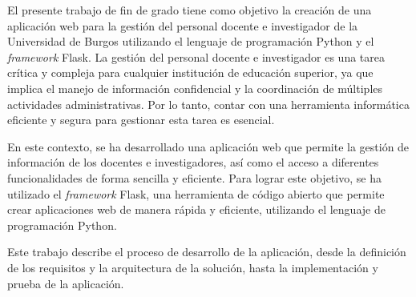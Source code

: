 
El presente trabajo de fin de grado tiene como objetivo la creación de una aplicación web para la gestión del personal docente e investigador de la Universidad de Burgos utilizando el lenguaje de programación Python y el \textit{framework} Flask. La gestión del personal docente e investigador es una tarea crítica y compleja para cualquier institución de educación superior, ya que implica el manejo de información confidencial y la coordinación de múltiples actividades administrativas. Por lo tanto, contar con una herramienta informática eficiente y segura para gestionar esta tarea es esencial.

En este contexto, se ha desarrollado una aplicación web que permite la gestión de información de los docentes e investigadores, así como el acceso a diferentes funcionalidades de forma sencilla y eficiente. Para lograr este objetivo, se ha utilizado el \textit{framework} Flask, una herramienta de código abierto que permite crear aplicaciones web de manera rápida y eficiente, utilizando el lenguaje de programación Python.

Este trabajo describe el proceso de desarrollo de la aplicación, desde la definición de los requisitos y la arquitectura de la solución, hasta la implementación y prueba de la aplicación. 